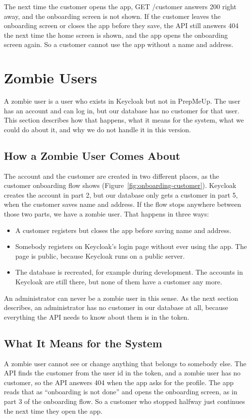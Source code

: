 \documentclass[a4paper,11pt]{article}
\begin{document}
The next time the customer opens the app, GET /customer answers 200 right away, and the onboarding screen is not shown. If the customer leaves the onboarding screen or closes the app before they save, the API still answers 404 the next time the home screen is shown, and the app opens the onboarding screen again. So a customer cannot use the app without a name and address.

\section{Zombie Users}\label{sec:zombie-users}
A zombie user is a user who exists in Keycloak but not in PrepMeUp. The user has an account and can log in, but our database has no customer for that user. This section describes how that happens, what it means for the system, what we could do about it, and why we do not handle it in this version.

\subsection{How a Zombie User Comes About}
The account and the customer are created in two different places, as the customer onboarding flow shows (Figure~\ref{fig:onboarding-customer}). Keycloak creates the account in part 2, but our database only gets a customer in part 5, when the customer saves name and address. If the flow stops anywhere between those two parts, we have a zombie user. That happens in three ways:
\begin{itemize}
  \item A customer registers but closes the app before saving name and address.
  \item Somebody registers on Keycloak's login page without ever using the app. The page is public, because Keycloak runs on a public server.
  \item The database is recreated, for example during development. The accounts in Keycloak are still there, but none of them have a customer any more.
\end{itemize}

An administrator can never be a zombie user in this sense. As the next section describes, an administrator has no customer in our database at all, because everything the API needs to know about them is in the token.

\subsection{What It Means for the System}
A zombie user cannot see or change anything that belongs to somebody else. The API finds the customer from the user id in the token, and a zombie user has no customer, so the API answers 404 when the app asks for the profile. The app reads that as ``onboarding is not done'' and opens the onboarding screen, as in part 3 of the onboarding flow. So a customer who stopped halfway just continues the next time they open the app.
\end{document}

